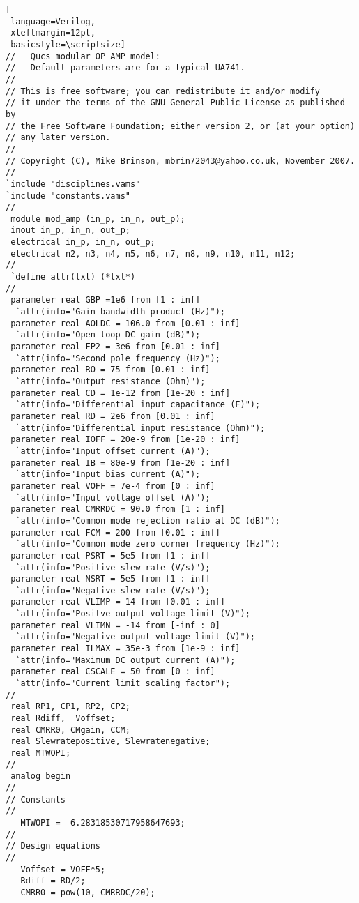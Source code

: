 \begin{lstlisting}[
 language=Verilog, 
 xleftmargin=12pt,
 basicstyle=\scriptsize]
//   Qucs modular OP AMP model:
//   Default parameters are for a typical UA741.
//
// This is free software; you can redistribute it and/or modify
// it under the terms of the GNU General Public License as published by
// the Free Software Foundation; either version 2, or (at your option)
// any later version.
// 
// Copyright (C), Mike Brinson, mbrin72043@yahoo.co.uk, November 2007.
//
`include "disciplines.vams"
`include "constants.vams"
// 
 module mod_amp (in_p, in_n, out_p);
 inout in_p, in_n, out_p;
 electrical in_p, in_n, out_p;
 electrical n2, n3, n4, n5, n6, n7, n8, n9, n10, n11, n12;
//   
 `define attr(txt) (*txt*)
//
 parameter real GBP =1e6 from [1 : inf]
  `attr(info="Gain bandwidth product (Hz)");
 parameter real AOLDC = 106.0 from [0.01 : inf] 
  `attr(info="Open loop DC gain (dB)");
 parameter real FP2 = 3e6 from [0.01 : inf]
  `attr(info="Second pole frequency (Hz)");
 parameter real RO = 75 from [0.01 : inf]
  `attr(info="Output resistance (Ohm)");
 parameter real CD = 1e-12 from [1e-20 : inf]
  `attr(info="Differential input capacitance (F)");
 parameter real RD = 2e6 from [0.01 : inf]
  `attr(info="Differential input resistance (Ohm)");
 parameter real IOFF = 20e-9 from [1e-20 : inf]
  `attr(info="Input offset current (A)");
 parameter real IB = 80e-9 from [1e-20 : inf]
  `attr(info="Input bias current (A)");
 parameter real VOFF = 7e-4 from [0 : inf]
  `attr(info="Input voltage offset (A)");
 parameter real CMRRDC = 90.0 from [1 : inf]
  `attr(info="Common mode rejection ratio at DC (dB)");
 parameter real FCM = 200 from [0.01 : inf]
  `attr(info="Common mode zero corner frequency (Hz)");
 parameter real PSRT = 5e5 from [1 : inf]
  `attr(info="Positive slew rate (V/s)");
 parameter real NSRT = 5e5 from [1 : inf]
  `attr(info="Negative slew rate (V/s)");
 parameter real VLIMP = 14 from [0.01 : inf]
  `attr(info="Positve output voltage limit (V)");
 parameter real VLIMN = -14 from [-inf : 0]
  `attr(info="Negative output voltage limit (V)");
 parameter real ILMAX = 35e-3 from [1e-9 : inf]
  `attr(info="Maximum DC output current (A)");
 parameter real CSCALE = 50 from [0 : inf]
  `attr(info="Current limit scaling factor");
// 
 real RP1, CP1, RP2, CP2;
 real Rdiff,  Voffset;
 real CMRR0, CMgain, CCM; 
 real Slewratepositive, Slewratenegative;
 real MTWOPI;
//
 analog begin
//
// Constants
//
   MTWOPI =  6.28318530717958647693;
//
// Design equations
//
   Voffset = VOFF*5;
   Rdiff = RD/2;
   CMRR0 = pow(10, CMRRDC/20);

\end{lstlisting}
